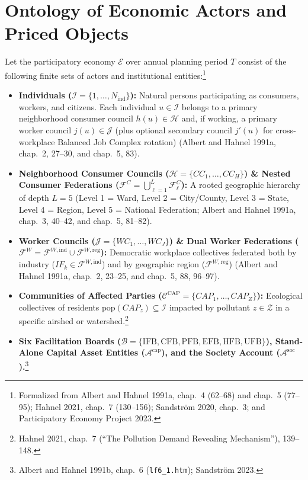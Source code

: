 \documentclass[10pt,twoside,openany]{book}
\theoremstyle{dpepstyle}
\begin{document}
\section{Ontology of Economic Actors and Priced Objects}
\label{sec:ontology}

Let the participatory economy $\mathcal{E}$ over annual planning period $T$ consist of the following finite sets of actors and institutional entities:\footnote{Formalized from Albert and Hahnel 1991a, chap.~4 (62--68) and chap.~5 (77--95); Hahnel 2021, chap.~7 (130--156); Sandstr\"om 2020, chap.~3; and Participatory Economy Project 2023.}
\begin{itemize}[leftmargin=1.6em,itemsep=2pt]
  \item \textbf{Individuals ($\mathcal{I} = \{1, \dots, N_{\text{ind}}\}$):} Natural persons participating as consumers, workers, and citizens. Each individual $u \in \mathcal{I}$ belongs to a primary neighborhood consumer council $h(u) \in \mathcal{H}$ and, if working, a primary worker council $j(u) \in \mathcal{J}$ (plus optional secondary council $j'(u)$ for cross-workplace Balanced Job Complex rotation) (Albert and Hahnel 1991a, chap.~2, 27--30, and chap.~5, 83).
  \item \textbf{Neighborhood Consumer Councils ($\mathcal{H} = \{CC_1, \dots, CC_H\}$) \& Nested Consumer Federations ($\mathcal{F}^C = \bigcup_{\ell=1}^L \mathcal{F}^C_\ell$):} A rooted geographic hierarchy of depth $L=5$ (Level 1 = Ward, Level 2 = City/County, Level 3 = State, Level 4 = Region, Level 5 = National Federation; Albert and Hahnel 1991a, chap.~3, 40--42, and chap.~5, 81--82).
  \item \textbf{Worker Councils ($\mathcal{J} = \{WC_1, \dots, WC_J\}$) \& Dual Worker Federations ($\mathcal{F}^W = \mathcal{F}^{W,\text{ind}} \cup \mathcal{F}^{W,\text{reg}}$):} Democratic workplace collectives federated both by industry ($IF_k \in \mathcal{F}^{W,\text{ind}}$) and by geographic region ($\mathcal{F}^{W,\text{reg}}$) (Albert and Hahnel 1991a, chap.~2, 23--25, and chap.~5, 88, 96--97).
  \item \textbf{Communities of Affected Parties ($\mathcal{C}^{\text{CAP}} = \{CAP_1, \dots, CAP_Z\}$):} Ecological collectives of residents $\text{pop}(CAP_z) \subseteq \mathcal{I}$ impacted by pollutant $z \in \mathcal{Z}$ in a specific airshed or watershed.\footnote{Hahnel 2021, chap.~7 (``The Pollution Demand Revealing Mechanism''), 139--148.}
  \item \textbf{Six Facilitation Boards ($\mathcal{B} = \{\text{IFB}, \text{CFB}, \text{PFB}, \text{EFB}, \text{HFB}, \text{UFB}\}$), Stand-Alone Capital Asset Entities ($\mathcal{A}^{\text{cap}}$), and the Society Account ($\mathcal{A}^{\text{soc}}$).}\footnote{Albert and Hahnel 1991b, chap.~6 (\texttt{lf6\_1.htm}); Sandstr\"om 2023.}
\end{itemize}
\end{document}
